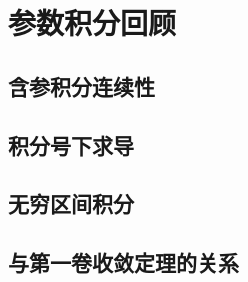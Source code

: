 \section{参数积分回顾}
\label{b2:sec:0103}


\subsection{含参积分连续性}
\label{b2:subsec:010301}

\subsection{积分号下求导}
\label{b2:subsec:010302}

\subsection{无穷区间积分}
\label{b2:subsec:010303}

\subsection{与第一卷收敛定理的关系}
\label{b2:subsec:010304}


